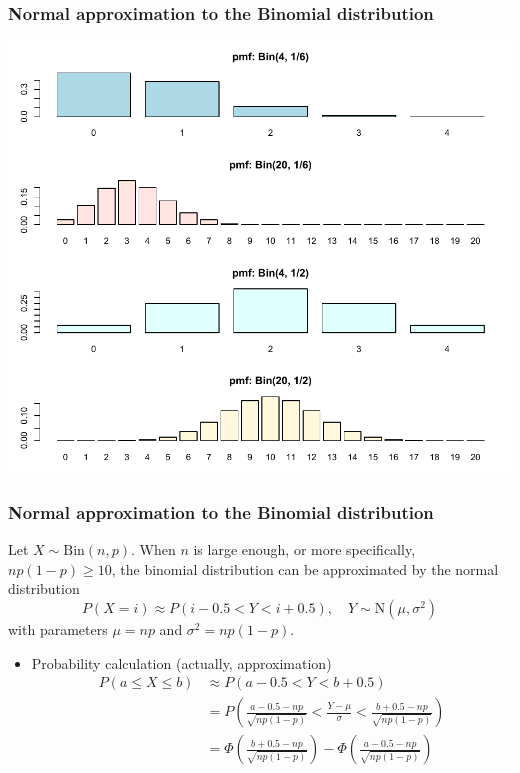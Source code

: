 \documentclass[slidestop,compress,mathserif]{beamer}
\begin{document}
\begin{frame}
\frametitle{Normal approximation to the Binomial distribution}

\vspace{-0.5cm}
\begin{center}
\includegraphics[scale = 0.6]{figures/pmf2}
\end{center}

\end{frame}



\begin{frame}
\frametitle{Normal approximation to the Binomial distribution}

Let $X \sim \text{Bin}(n, p)$.
When $n$ is large enough, or more specifically, $np (1-p) \geq 10$,
the binomial distribution can be approximated by the normal distribution
\[ P(X = i) \approx P(i - 0.5 < Y < i + 0.5), \quad Y \sim \text{N}(\mu, \sigma^2) \]
with parameters $\mu = np$ and $\sigma^2 = np(1-p)$.

\pause
\begin{itemize}
\item Probability calculation (actually, approximation)
\begin{align*}
P(a \leq X \leq b) &\approx P(a - 0.5 < Y < b + 0.5) \\
& = P\left( \frac{a - 0.5 - np}{\sqrt{np(1-p)}} < \frac{Y - \mu}{\sigma} < \frac{b + 0.5 - np}{\sqrt{np(1-p)}} \right)\\
& = \Phi\left( \frac{b + 0.5 - np}{\sqrt{np(1-p)}} \right) -  \Phi\left( \frac{a - 0.5 - np}{\sqrt{np(1-p)}} \right)
\end{align*}



\end{itemize}

\end{frame}
\end{document}
